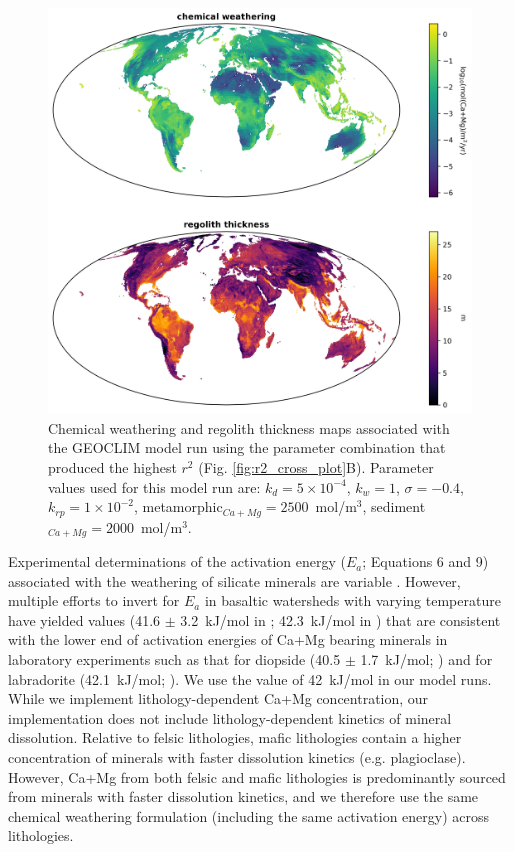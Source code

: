 \documentclass[11pt,letterpaper]{article}
\begin{document}
\begin{figure}[h!]
    \centering
    \includegraphics[width=1\textwidth]{Figures/weathering_regolith_maps.jpg}
    \caption{Chemical weathering and regolith thickness maps associated with the GEOCLIM model run using the parameter combination that produced the highest $r^{2}$ (Fig. \ref{fig:r2_cross_plot}B). Parameter values used for this model run are: $k_{d}=5\times10^{-4}$, $k_{w}=1$, $\sigma=-0.4$, $k_{rp}=1\times10^{-2}$, metamorphic$_{Ca+Mg}=2500$~mol/m$^{3}$, sediment$_{Ca+Mg}=2000$~mol/m$^{3}$.}
    \label{fig:weathering_regolith_maps}
\end{figure}

Experimental determinations of the activation energy ($E_a$; Equations 6 and 9) associated with the weathering of silicate minerals are variable \citep{Brantley2003a}. However, multiple efforts to invert for $E_a$ in basaltic watersheds with varying temperature have yielded values (41.6 $\pm$ 3.2~kJ/mol in \citealp{Li2016a}; 42.3~kJ/mol in \citealp{Dessert2001a}) that are consistent with the lower end of activation energies of Ca+Mg bearing minerals in laboratory experiments such as that for diopside (40.5 $\pm$ 1.7~kJ/mol; \citealp{Knauss1993a}) and for labradorite (42.1~kJ/mol; \citealp{Carroll2005a}). We use the value of 42~kJ/mol in our model runs. While we implement lithology-dependent Ca+Mg concentration, our implementation does not include lithology-dependent kinetics of mineral dissolution. Relative to felsic lithologies, mafic lithologies contain a higher concentration of minerals with faster dissolution kinetics (e.g. plagioclase). However, Ca+Mg from both felsic and mafic lithologies is predominantly sourced from minerals with faster dissolution kinetics, and we therefore use the same chemical weathering formulation (including the same activation energy) across lithologies.
\end{document}
